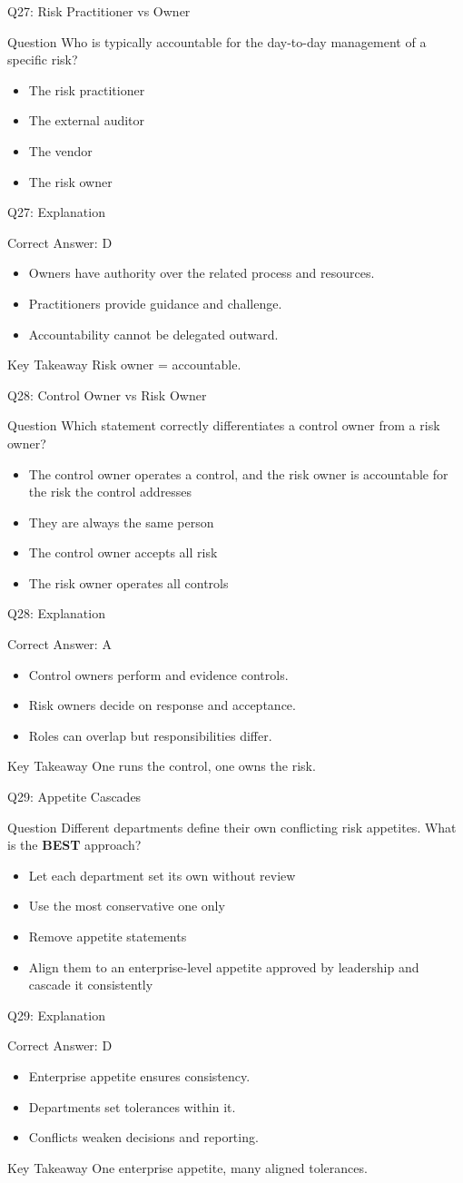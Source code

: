 \documentclass[aspectratio=169]{beamer}
\newcommand{\hq}[7]{%
	\begin{frame}{Q#1: #2}
		\begin{block}{Question}
			#3
		\end{block}
		\begin{itemize}
			#4
		\end{itemize}
	\end{frame}
	\begin{frame}{Q#1: Explanation}
		\begin{block}{Correct Answer: #5}
			\begin{itemize}
				#6
			\end{itemize}
		\end{block}
		\begin{alertblock}{Key Takeaway}
			#7
		\end{alertblock}
	\end{frame}
}
\begin{document}
	\hq{27}{Risk Practitioner vs Owner}
	{Who is typically accountable for the day-to-day management of a specific risk?}
	{\item[\textbf{(A)}] The risk practitioner
		\item[\textbf{(B)}] The external auditor
		\item[\textbf{(C)}] The vendor
		\item[\textbf{(D)}] The risk owner}
	{D}
	{\item Owners have authority over the related process and resources.
		\item Practitioners provide guidance and challenge.
		\item Accountability cannot be delegated outward.}
	{Risk owner = accountable.}
	
	\hq{28}{Control Owner vs Risk Owner}
	{Which statement correctly differentiates a control owner from a risk owner?}
	{\item[\textbf{(A)}] The control owner operates a control, and the risk owner is accountable for the risk the control addresses
		\item[\textbf{(B)}] They are always the same person
		\item[\textbf{(C)}] The control owner accepts all risk
		\item[\textbf{(D)}] The risk owner operates all controls}
	{A}
	{\item Control owners perform and evidence controls.
		\item Risk owners decide on response and acceptance.
		\item Roles can overlap but responsibilities differ.}
	{One runs the control, one owns the risk.}
	
	\hq{29}{Appetite Cascades}
	{Different departments define their own conflicting risk appetites. What is the \textbf{BEST} approach?}
	{\item[\textbf{(A)}] Let each department set its own without review
		\item[\textbf{(B)}] Use the most conservative one only
		\item[\textbf{(C)}] Remove appetite statements
		\item[\textbf{(D)}] Align them to an enterprise-level appetite approved by leadership and cascade it consistently}
	{D}
	{\item Enterprise appetite ensures consistency.
		\item Departments set tolerances within it.
		\item Conflicts weaken decisions and reporting.}
	{One enterprise appetite, many aligned tolerances.}
	
\end{document}
